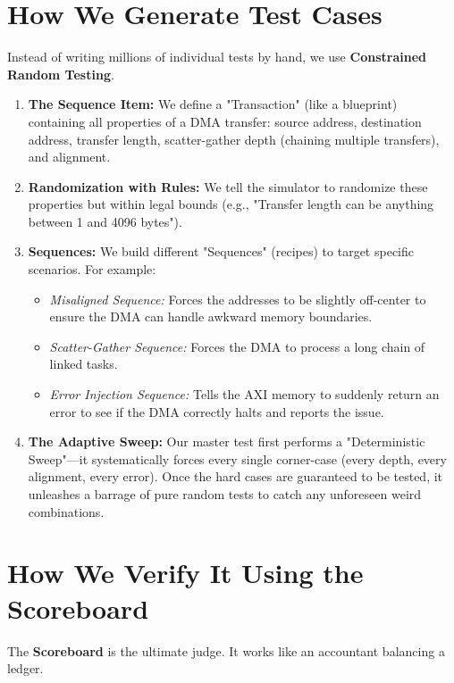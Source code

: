 \documentclass[12pt]{article}
\begin{document}
\section*{How We Generate Test Cases}
Instead of writing millions of individual tests by hand, we use \textbf{Constrained Random Testing}.

\begin{enumerate}
    \item \textbf{The Sequence Item:} We define a "Transaction" (like a blueprint) containing all properties of a DMA transfer: source address, destination address, transfer length, scatter-gather depth (chaining multiple transfers), and alignment.
    \item \textbf{Randomization with Rules:} We tell the simulator to randomize these properties but within legal bounds (e.g., "Transfer length can be anything between 1 and 4096 bytes"). 
    \item \textbf{Sequences:} We build different "Sequences" (recipes) to target specific scenarios. For example:
    \begin{itemize}
        \item \textit{Misaligned Sequence:} Forces the addresses to be slightly off-center to ensure the DMA can handle awkward memory boundaries.
        \item \textit{Scatter-Gather Sequence:} Forces the DMA to process a long chain of linked tasks.
        \item \textit{Error Injection Sequence:} Tells the AXI memory to suddenly return an error to see if the DMA correctly halts and reports the issue.
    \end{itemize}
    \item \textbf{The Adaptive Sweep:} Our master test first performs a "Deterministic Sweep"---it systematically forces every single corner-case (every depth, every alignment, every error). Once the hard cases are guaranteed to be tested, it unleashes a barrage of pure random tests to catch any unforeseen weird combinations.
\end{enumerate}

\section*{How We Verify It Using the Scoreboard}
The \textbf{Scoreboard} is the ultimate judge. It works like an accountant balancing a ledger.
\end{document}
